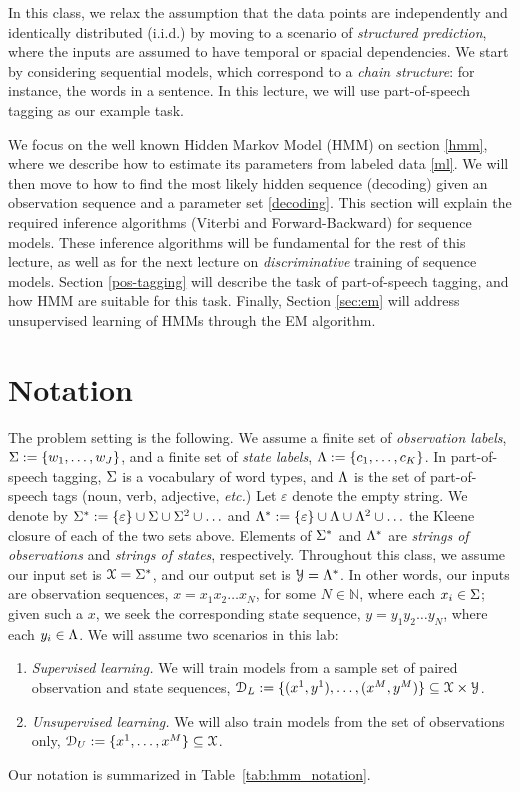 

In this class, we relax the assumption that
the data points are independently and identically distributed (i.i.d.) 
by moving to a scenario of \emph{structured prediction}, where the inputs are assumed to have
temporal or spacial dependencies. We start by 
considering sequential models, which correspond to a \emph{chain structure}: for instance,
the words in a sentence. In this lecture, we will use part-of-speech
tagging as our example task.  

We focus on the well known Hidden Markov Model (HMM) on section
\ref{hmm}, where we describe how to estimate its parameters from labeled data
\ref{ml}. We will then move to how to find the most likely hidden sequence
(decoding) given an observation sequence and a parameter set
\ref{decoding}. This section will explain the required inference
algorithms (Viterbi and Forward-Backward) for sequence models. These
inference algorithms will be fundamental for the rest of this lecture,
as well as for the next lecture on \emph{discriminative} training of sequence
models. Section \ref{pos-tagging} will describe the task of 
part-of-speech tagging, and how HMM are suitable for this task. 
Finally, Section \ref{sec:em} will 
address unsupervised learning of HMMs through the EM
algorithm.


\section{Notation}

The problem setting is the following. 
We assume a finite set of \emph{observation labels}, 
$\Sigma := \{w_1,\ldots,w_J\}$,
and a finite set of \emph{state labels}, 
$\Lambda := \{c_1,\ldots, c_K\}$.
In part-of-speech tagging, $\Sigma$ is a 
vocabulary of word types, and 
$\Lambda$ is the set of part-of-speech tags 
(noun, verb, adjective, \emph{etc.})
Let $\varepsilon$ denote the empty string. 
We denote by 
$\Sigma^* := \{\varepsilon\} \cup \Sigma \cup \Sigma^2 \cup \ldots$ and 
$\Lambda^* := \{\varepsilon\} \cup \Lambda \cup \Lambda^2  \cup \ldots$ the Kleene closure 
of each of the two sets above. 
Elements of $\Sigma^*$ and $\Lambda^*$ 
are \emph{strings of observations} and \emph{strings of states}, 
respectively. 
Throughout this class, we 
assume our input set is $\mathcal{X} = \Sigma^*$, 
and our output set is $\mathcal{Y} = \Lambda^*$. 
In other words, 
our inputs are observation sequences, 
$x = x_1 x_2 \ldots x_N$, 
for some $N \in \mathbb{N}$, where each $x_i \in \Sigma$;
given such a $x$, we seek 
the corresponding state sequence, 
$y = y_1 y_2 \ldots y_N$, 
where each $y_i \in \Lambda$.
We will assume two scenarios in this lab:
\begin{enumerate}
\item \emph{Supervised learning.} We will 
train models from a sample set of paired observation and state sequences, $\mathcal{D}_L := \{(x^1,y^1), \ldots, (x^M,y^M)\} \subseteq \mathcal{X} \times \mathcal{Y}$.
\item \emph{Unsupervised learning.} We will also
train models from the set of observations only, $\mathcal{D}_U := \{x^1, \ldots, x^M\} \subseteq \mathcal{X}$.
\end{enumerate}
Our notation is summarized in Table~\ref{tab:hmm_notation}.


